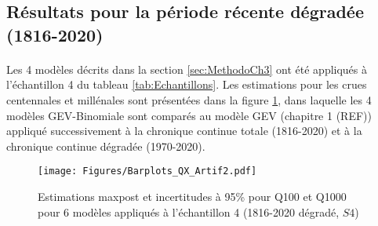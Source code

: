 \documentclass[11pt]{article}
\begin{document}
	\FloatBarrier	
	
	\subsection{Résultats pour la période récente dégradée (1816-2020)}
	\label{subsec:ResultsArtif}
	
	\paragraph{} 
	Les 4 modèles décrits dans la section \ref{sec:MethodoCh3} ont été appliqués à l'échantillon 4 du tableau \ref{tab:Echantillons}. Les estimations pour les crues centennales et millénales sont présentées dans la figure \ref{fig:Barplot_Artif2}, dans laquelle les 4 modèles GEV-Binomiale sont comparés au modèle GEV (chapitre 1 (REF)) appliqué successivement à la chronique continue totale (1816-2020) et à la chronique continue dégradée (1970-2020).
	
	
	\begin{figure}[h]
		\centering
		\texttt{[image: Figures/Barplots\_QX\_Artif2.pdf]}	
		\caption{Estimations maxpost et incertitudes à 95\% pour Q100 et Q1000 pour 6 modèles appliqués à l'échantillon 4 (1816-2020 dégradé, $S4$)}
		\label{fig:Barplot_Artif2}
	\end{figure}

	\begin{table}[h]
	\centering
		\caption{Résultats maxpost et incertitudes des 6 modèles pour l'échantillon 4. Q100 et Q1000 représentent respectivement le débit des crues centennales et millénales, $\xi$ le paramètre de forme de la distribution GEV, $S$ le seuil de perception et $t*$ la date de début de la période historique. Les écarts type des distributions a posteriori sont représentés par les colonnes débutant par la lettre "u".}
		\label{tab:ResArtif2}
	\end{table}
	
\end{document}

